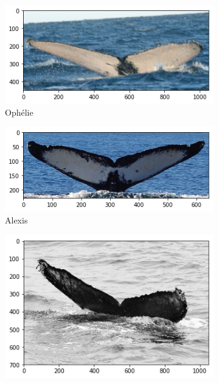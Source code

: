 \begin{frame}[c]
    \begin{figure}
        \centering
        \begin{subfigure}[b]{0.24\linewidth}
            \centering
            \includegraphics[width=\linewidth]{Whales/new_whale0.png}
            \caption{Ophélie}
        \end{subfigure}
        \begin{subfigure}[b]{0.24\linewidth}
            \centering
            \includegraphics[width=\linewidth]{Whales/new_whale4.png}
            \caption{Alexis}
        \end{subfigure}
        \begin{subfigure}[b]{0.24\linewidth}
            \centering
            \includegraphics[width=\linewidth]{Whales/w_6310ac7.png}

\end{subfigure}
\end{figure}
\end{frame}
